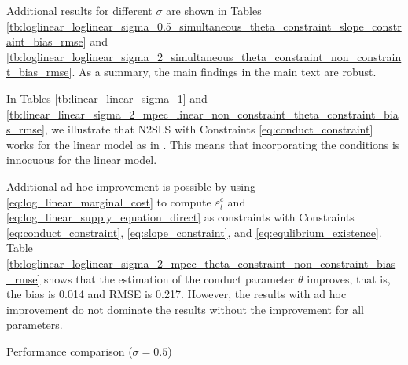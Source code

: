 \documentclass[11pt, a4paper]{article}
\begin{document}
Additional results for different $\sigma$ are shown in Tables \ref{tb:loglinear_loglinear_sigma_0.5_simultaneous_theta_constraint_slope_constraint_bias_rmse} and \ref{tb:loglinear_loglinear_sigma_2_simultaneous_theta_constraint_non_constraint_bias_rmse}. 
As a summary, the main findings in the main text are robust.

In Tables \ref{tb:linear_linear_sigma_1} and  \ref{tb:linear_linear_sigma_2_mpec_linear_non_constraint_theta_constraint_bias_rmse}, we illustrate that N2SLS with Constraints \eqref{eq:conduct_constraint} works for the linear model as in \cite{matsumura2023resolving}. 
This means that incorporating the conditions is innocuous for the linear model.

Additional ad hoc improvement is possible by using \eqref{eq:log_linear_marginal_cost} to compute $\varepsilon_t^c$ and \eqref{eq:log_linear_supply_equation_direct} as constraints with Constraints \eqref{eq:conduct_constraint}, \eqref{eq:slope_constraint}, and \eqref{eq:equlibrium_existence}. 
Table \ref{tb:loglinear_loglinear_sigma_2_mpec_theta_constraint_non_constraint_bias_rmse} shows that the estimation of the conduct parameter $\theta$ improves, that is, the bias is 0.014 and RMSE is 0.217. 
However, the results with ad hoc improvement do not dominate the results without the improvement for all parameters.

\begin{landscape}{
\begin{table}[!htbp]
  \begin{center}
      \caption{Performance comparison ($\sigma=0.5$)}
      \label{tb:loglinear_loglinear_sigma_0.5_simultaneous_theta_constraint_slope_constraint_bias_rmse} 
      \\
  \end{center}
  \footnotesize
  
\end{table} 
}
\end{landscape}
\end{document}
